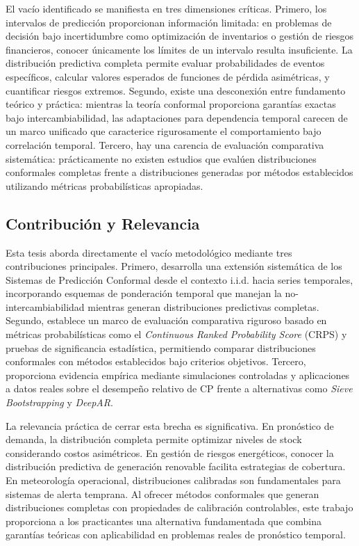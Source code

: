 El vacío identificado se manifiesta en tres dimensiones críticas. Primero, los intervalos de predicción proporcionan información limitada: en problemas de decisión bajo incertidumbre como optimización de inventarios o gestión de riesgos financieros, conocer únicamente los límites de un intervalo resulta insuficiente. La distribución predictiva completa permite evaluar probabilidades de eventos específicos, calcular valores esperados de funciones de pérdida asimétricas, y cuantificar riesgos extremos. Segundo, existe una desconexión entre fundamento teórico y práctica: mientras la teoría conformal proporciona garantías exactas bajo intercambiabilidad, las adaptaciones para dependencia temporal carecen de un marco unificado que caracterice rigurosamente el comportamiento bajo correlación temporal. Tercero, hay una carencia de evaluación comparativa sistemática: prácticamente no existen estudios que evalúen distribuciones conformales completas frente a distribuciones generadas por métodos establecidos utilizando métricas probabilísticas apropiadas.

\subsection{Contribución y Relevancia}

Esta tesis aborda directamente el vacío metodológico mediante tres contribuciones principales. Primero, desarrolla una extensión sistemática de los Sistemas de Predicción Conformal desde el contexto i.i.d. hacia series temporales, incorporando esquemas de ponderación temporal que manejan la no-intercambiabilidad mientras generan distribuciones predictivas completas. Segundo, establece un marco de evaluación comparativa riguroso basado en métricas probabilísticas como el \textit{Continuous Ranked Probability Score} (CRPS) y pruebas de significancia estadística, permitiendo comparar distribuciones conformales con métodos establecidos bajo criterios objetivos. Tercero, proporciona evidencia empírica mediante simulaciones controladas y aplicaciones a datos reales sobre el desempeño relativo de CP frente a alternativas como \textit{Sieve Bootstrapping} y \textit{DeepAR}.

La relevancia práctica de cerrar esta brecha es significativa. En pronóstico de demanda, la distribución completa permite optimizar niveles de stock considerando costos asimétricos. En gestión de riesgos energéticos, conocer la distribución predictiva de generación renovable facilita estrategias de cobertura. En meteorología operacional, distribuciones calibradas son fundamentales para sistemas de alerta temprana. Al ofrecer métodos conformales que generan distribuciones completas con propiedades de calibración controlables, este trabajo proporciona a los practicantes una alternativa fundamentada que combina garantías teóricas con aplicabilidad en problemas reales de pronóstico temporal.

